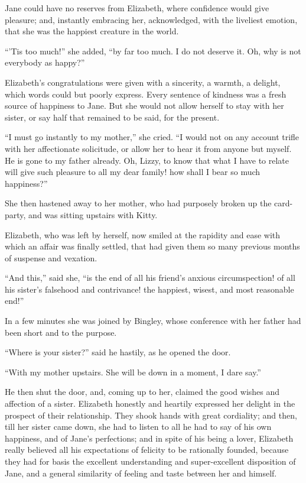 \documentclass[12pt,openright]{book}
\begin{document}
Jane could have no reserves from Elizabeth, where confidence would give pleasure; and, instantly embracing her, acknowledged, with the liveliest emotion, that she was the happiest creature in the world.

“’Tis too much!” she added, “by far too much. I do not deserve it. Oh, why is not everybody as happy?”

Elizabeth’s congratulations were given with a sincerity, a warmth, a delight, which words could but poorly express. Every sentence of kindness was a fresh source of happiness to Jane. But she would not allow herself to stay with her sister, or say half that remained to be said, for the present.

“I must go instantly to my mother,” she cried. “I would not on any account trifle with her affectionate solicitude, or allow her to hear it from anyone but myself. He is gone to my father already. Oh, Lizzy, to know that what I have to relate will give such pleasure to all my dear family! how shall I bear so much happiness?”

She then hastened away to her mother, who had purposely broken up the card-party, and was sitting upstairs with Kitty.

Elizabeth, who was left by herself, now smiled at the rapidity and ease with which an affair was finally settled, that had given them so many previous months of suspense and vexation.

“And this,” said she, “is the end of all his friend’s anxious circumspection! of all his sister’s falsehood and contrivance! the happiest, wisest, and most reasonable end!”

In a few minutes she was joined by Bingley, whose conference with her father had been short and to the purpose.

“Where is your sister?” said he hastily, as he opened the door.

“With my mother upstairs. She will be down in a moment, I dare say.”

He then shut the door, and, coming up to her, claimed the good wishes and affection of a sister. Elizabeth honestly and heartily expressed her delight in the prospect of their relationship. They shook hands with great cordiality; and then, till her sister came down, she had to listen to all he had to say of his own happiness, and of Jane’s perfections; and in spite of his being a lover, Elizabeth really believed all his expectations of felicity to be rationally founded, because they had for basis the excellent understanding and super-excellent disposition of Jane, and a general similarity of feeling and taste between her and himself.
\end{document}

